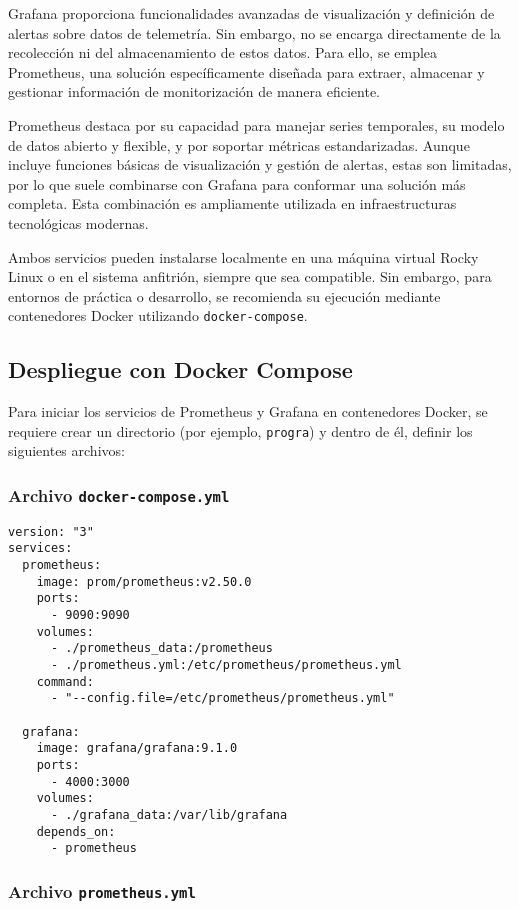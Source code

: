 Grafana proporciona funcionalidades avanzadas de visualización y definición de alertas sobre datos de telemetría. Sin embargo, no se encarga directamente de la recolección ni del almacenamiento de estos datos. Para ello, se emplea Prometheus, una solución específicamente diseñada para extraer, almacenar y gestionar información de monitorización de manera eficiente.

Prometheus destaca por su capacidad para manejar series temporales, su modelo de datos abierto y flexible, y por soportar métricas estandarizadas. Aunque incluye funciones básicas de visualización y gestión de alertas, estas son limitadas, por lo que suele combinarse con Grafana para conformar una solución más completa. Esta combinación es ampliamente utilizada en infraestructuras tecnológicas modernas.

Ambos servicios pueden instalarse localmente en una máquina virtual Rocky Linux o en el sistema anfitrión, siempre que sea compatible. Sin embargo, para entornos de práctica o desarrollo, se recomienda su ejecución mediante contenedores Docker utilizando \texttt{docker-compose}.

\subsection*{Despliegue con Docker Compose}

Para iniciar los servicios de Prometheus y Grafana en contenedores Docker, se requiere crear un directorio (por ejemplo, \texttt{progra}) y dentro de él, definir los siguientes archivos:

\subsubsection*{Archivo \texttt{docker-compose.yml}}

\begin{verbatim}
version: "3"
services:
  prometheus:
    image: prom/prometheus:v2.50.0
    ports:
      - 9090:9090
    volumes:
      - ./prometheus_data:/prometheus
      - ./prometheus.yml:/etc/prometheus/prometheus.yml
    command:
      - "--config.file=/etc/prometheus/prometheus.yml"

  grafana:
    image: grafana/grafana:9.1.0
    ports:
      - 4000:3000
    volumes:
      - ./grafana_data:/var/lib/grafana
    depends_on:
      - prometheus
\end{verbatim}

\subsubsection*{Archivo \texttt{prometheus.yml}}

